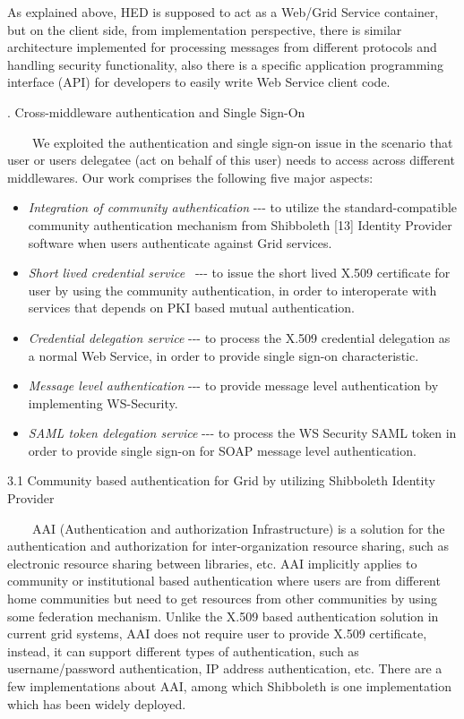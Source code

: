 \documentclass{article}
\newcommand\liststyleLiii{%
\renewcommand\labelitemi{${\bullet}$}
\renewcommand\labelitemii{${\circ}$}
\renewcommand\labelitemiii{${\blacksquare}$}
\renewcommand\labelitemiv{${\bullet}$}
}
\begin{document}
As explained above, HED is supposed to act as a Web/Grid Service
container, but on the client side, from implementation perspective,
there is similar architecture implemented for processing messages from
different protocols and handling security functionality, also there is
a specific application programming interface (API) for developers to
easily write Web Service client code.


\bigskip

{. Cross-middleware authentication and Single Sign-On
\par}

\ \ \ \ We exploited the authentication and single sign-on issue in the
scenario that user or user{\textquotesingle}s delegatee (act on behalf
of this user) needs to access across different middlewares. Our work
comprises the following five major aspects:

\liststyleLiii
\begin{itemize}
\item \textit{Integration of community authentication} -{}-{}- to
utilize the standard-compatible community authentication mechanism from
Shibboleth [13] Identity Provider software when users authenticate
against Grid services.
\item \textit{Short lived credential service} \ {}-{}-{}- to issue the
short lived X.509 certificate for user by using the community
authentication, in order to interoperate with services that depends on
PKI based mutual authentication.
\item \textit{Credential delegation service} -{}-{}- to process the
X.509 credential delegation as a normal Web Service, in order to
provide single sign-on characteristic.
\item \textit{Message level authentication} -{}-{}- to provide message
level authentication by implementing WS-Security.
\item \textit{SAML token delegation service} -{}-{}- to process the WS
Security SAML token in order to provide single sign-on for SOAP message
level authentication.
\end{itemize}
3.1 Community based authentication for Grid by utilizing Shibboleth
Identity Provider

\ \ \ \ AAI (Authentication and authorization Infrastructure) is a
solution for the authentication and authorization for
inter-organization resource sharing, such as electronic resource
sharing between libraries, etc. AAI implicitly applies to community or
institutional based authentication where users are from different home
communities but need to get resources from other communities by using
some federation mechanism. Unlike the X.509 based authentication
solution in current grid systems, AAI does not require user to provide
X.509 certificate, instead, it can support different types of
authentication, such as username/password authentication, IP address
authentication, etc. There are a few implementations about AAI, among
which Shibboleth is one implementation which has been widely deployed.
\end{document}
